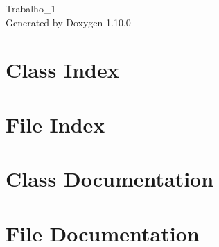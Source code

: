 \documentclass[twoside]{book}
\newcommand{\+}{\discretionary{\mbox{\scriptsize$\hookleftarrow$}}{}{}}
\newcommand{\clearemptydoublepage}{%
    \newpage{\pagestyle{empty}\cleardoublepage}%
  }
\begin{document}
  \raggedbottom
    \hypersetup{pageanchor=false,
                bookmarksnumbered=true,
                pdfencoding=unicode
               }
  \begin{titlepage}
  \vspace*{7cm}
  \begin{center}%
  {\Large Trabalho\+\_\+1}\\
  \vspace*{1cm}
  {\large Generated by Doxygen 1.10.0}\\
  \end{center}
  \end{titlepage}
  \clearemptydoublepage
  \tableofcontents
  \clearemptydoublepage
  \hypersetup{pageanchor=true}
\chapter{Class Index}

\chapter{File Index}

\chapter{Class Documentation}


























\chapter{File Documentation}


























  \backmatter
  \newpage
  \clearemptydoublepage
  \printindex
\end{document}

